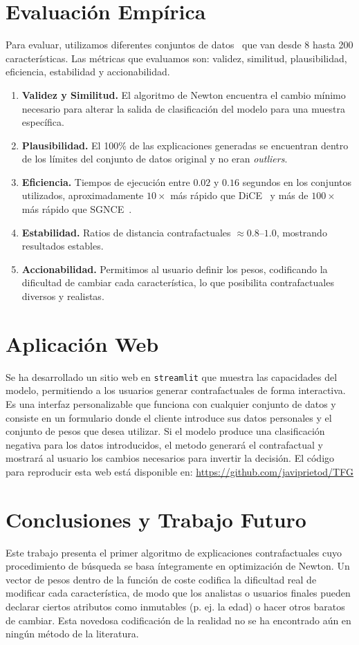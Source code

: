 \documentclass[12pt]{extarticle}
\numberwithin{equation}{section}
\begin{document}
\section*{Evaluación Empírica}
Para evaluar, utilizamos diferentes conjuntos de datos~\cite{kaggleLoan1,spambase,santander} que van desde 8 hasta 200 características. Las métricas que evaluamos son: validez, similitud, plausibilidad, eficiencia, estabilidad y accionabilidad.
\begin{enumerate}
\item \textbf{Validez y Similitud.} El algoritmo de Newton encuentra el cambio mínimo necesario para alterar la salida de clasificación del modelo para una muestra específica.
\item \textbf{Plausibilidad.} El 100\% de las explicaciones generadas se encuentran dentro de los límites del conjunto de datos original y no eran \emph{outliers}.
\item \textbf{Eficiencia.} Tiempos de ejecución entre $0.02$ y $0.16$ segundos en los conjuntos utilizados, aproximadamente $10\times$ más rápido que DiCE~\cite{dice} y más de $100\times$ más rápido que SGNCE~\cite{sgnce}.
\item \textbf{Estabilidad.} Ratios de distancia contrafactuales $\approx0.8$–$1.0$, mostrando resultados estables.
\item \textbf{Accionabilidad.} Permitimos al usuario definir los pesos, codificando la dificultad de cambiar cada característica, lo que posibilita contrafactuales diversos y realistas.
\end{enumerate}

\section*{Aplicación Web}
Se ha desarrollado un sitio web en \texttt{streamlit} que muestra las capacidades del modelo, permitiendo a los usuarios generar contrafactuales de forma interactiva. Es una interfaz personalizable que funciona con cualquier conjunto de datos y consiste en un formulario donde el cliente introduce sus datos personales y el conjunto de pesos que desea utilizar. Si el modelo produce una clasificación negativa para los datos introducidos, el metodo generará el contrafactual y mostrará al usuario los cambios necesarios para invertir la decisión. El código para reproducir esta web está disponible en: \url{https://github.com/javiprietod/TFG}

\section*{Conclusiones y Trabajo Futuro}
Este trabajo presenta el primer algoritmo de explicaciones contrafactuales cuyo procedimiento de búsqueda se basa íntegramente en optimización de Newton. Un vector de pesos dentro de la función de coste codifica la dificultad real de modificar cada característica, de modo que los analistas o usuarios finales pueden declarar ciertos atributos como inmutables (p. ej. la edad) o hacer otros baratos de cambiar. Esta novedosa codificación de la realidad no se ha encontrado aún en ningún método de la literatura.
\end{document}
